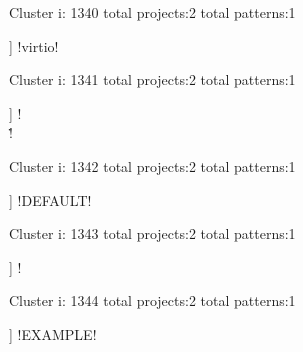 Cluster i: 1340
total projects:2
total patterns:1
\begin{multicols}{1}
\begin{description}[noitemsep,topsep=0pt]
\item [[2] ] \cverb!virtio!
\end{description}
\end{multicols}







Cluster i: 1341
total projects:2
total patterns:1
\begin{multicols}{1}
\begin{description}[noitemsep,topsep=0pt]
\item [[2] ] \cverb!\\\.!
\end{description}
\end{multicols}







Cluster i: 1342
total projects:2
total patterns:1
\begin{multicols}{1}
\begin{description}[noitemsep,topsep=0pt]
\item [[2] ] \cverb!DEFAULT!
\end{description}
\end{multicols}







Cluster i: 1343
total projects:2
total patterns:1
\begin{multicols}{1}
\begin{description}[noitemsep,topsep=0pt]
\item [[2] ] \cverb!\W%
\end{description}
\end{multicols}







Cluster i: 1344
total projects:2
total patterns:1
\begin{multicols}{1}
\begin{description}[noitemsep,topsep=0pt]
\item [[2] ] \cverb!EXAMPLE!
\end{description}
\end{multicols}








